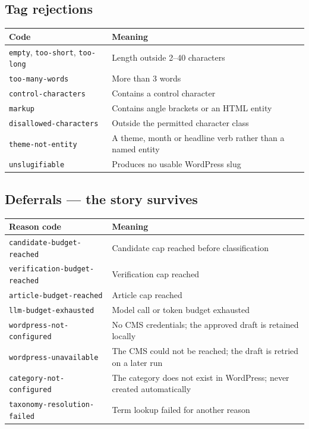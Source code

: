 \documentclass[11pt,a4paper]{article}
\newcommand{\brk}{\hyphenpenalty=0\exhyphenpenalty=0\relax}
\newcommand{\code}[1]{\texttt{\small\brk #1}}
\begin{document}
\subsection{Tag rejections}

\begin{center}
\footnotesize
\begin{tabularx}{\textwidth}{@{}>{\RaggedRight}p{5.6cm} >{\RaggedRight}X@{}}
\toprule
\textbf{Code} & \textbf{Meaning} \\
\midrule
\code{empty}, \code{too-short}, \code{too-long} & Length outside 2--40 characters \\
\code{too-many-words} & More than 3 words \\
\code{control-characters} & Contains a control character \\
\code{markup} & Contains angle brackets or an HTML entity \\
\code{disallowed-characters} & Outside the permitted character class \\
\code{theme-not-entity} & A theme, month or headline verb rather than a named entity \\
\code{unslugifiable} & Produces no usable WordPress slug \\
\bottomrule
\end{tabularx}
\end{center}

\subsection{Deferrals --- the story survives}

\begin{center}
\footnotesize
\begin{tabularx}{\textwidth}{@{}>{\RaggedRight}p{5.6cm} >{\RaggedRight}X@{}}
\toprule
\textbf{Reason code} & \textbf{Meaning} \\
\midrule
\code{candidate-}\allowbreak\code{budget-reached} & Candidate cap reached before classification \\
\code{verification-}\allowbreak\code{budget-reached} & Verification cap reached \\
\code{article-budget-reached} & Article cap reached \\
\code{llm-budget-exhausted} & Model call or token budget exhausted \\
\code{wordpress-}\allowbreak\code{not-configured} & No CMS credentials; the approved draft is retained locally \\
\code{wordpress-unavailable} & The CMS could not be reached; the draft is retried on a later run \\
\code{category-not-configured} & The category does not exist in WordPress; never created automatically \\
\code{taxonomy-resolution-failed} & Term lookup failed for another reason \\
\bottomrule
\end{tabularx}
\end{center}
\end{document}
